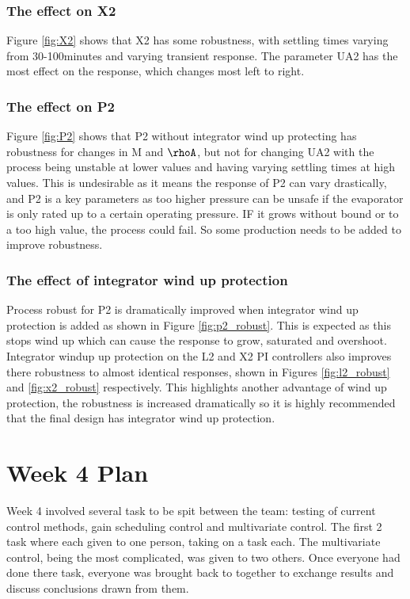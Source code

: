 \documentclass[11pt]{article}
\begin{document}
\subsubsection{The effect on X2}
Figure \ref{fig:X2} shows that X2 has some robustness, with settling times varying from 30-100minutes and varying transient response. The parameter UA2 has the most effect on the response, which changes most left to right.

\subsubsection{The effect on P2}
Figure \ref{fig:P2} shows that P2 without integrator wind up protecting has robustness for changes in M and $\rhoA$, but not for changing UA2 with the process being unstable at lower values and having varying settling times at high values. This is undesirable as it means the response of P2 can vary drastically, and P2 is a key parameters as too higher pressure can be unsafe if the evaporator is only rated up to a certain operating pressure. IF it grows without bound or to a too high value, the process could fail. So some production needs to be added to improve robustness.

\subsubsection{The effect of integrator wind up protection}
Process robust for P2 is dramatically improved when integrator wind up protection is added as shown in Figure \ref{fig:p2_robust}. This is expected as this stops wind up which can cause the response to grow, saturated and overshoot. Integrator windup up protection on the L2 and X2 PI controllers also improves there robustness to almost identical responses, shown in Figures \ref{fig:l2_robust} and \ref{fig:x2_robust} respectively. This highlights another advantage of wind up protection, the robustness is increased dramatically so it is highly recommended that the final design has integrator wind up protection. 

\section{Week 4 Plan}
Week 4 involved several task to be spit between the team: testing of current control methods, gain scheduling control and multivariate control. The first 2 task where each given to one person, taking on a task each. The multivariate control, being the most complicated, was given to two others. Once everyone had done there task, everyone was brought back to together to exchange results and discuss conclusions drawn from them.
\end{document}
